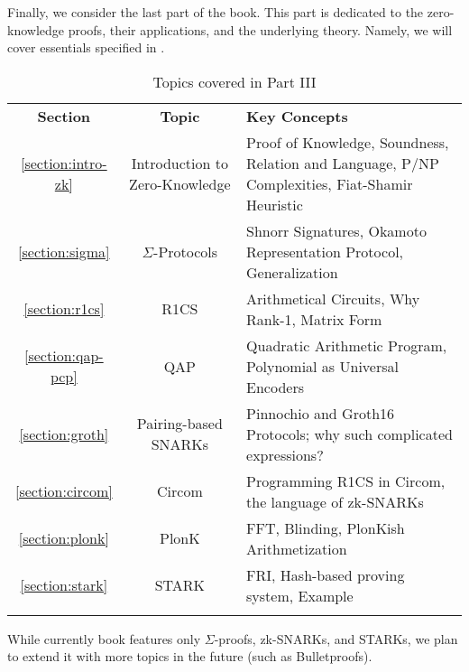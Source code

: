 \documentclass[../../lecture-notes-148x210.tex]{subfiles}
\begin{document}
Finally, we consider the last part of the book. This part is dedicated to the
zero-knowledge proofs, their applications, and the underlying theory. Namely, we
will cover essentials specified in .

\begin{table}[H]
    \centering
    \begin{tabularx}{\textwidth}{ccX}
        \Xhline{3\arrayrulewidth}
        \rowcolor{purple!30}\textbf{Section} & \textbf{Topic} & \textbf{Key Concepts} \\
        \Xhline{3\arrayrulewidth}
        \rowcolor{purple!10}\ref{section:intro-zk} & Introduction to Zero-Knowledge & Proof of Knowledge, 
        Soundness, Relation and Language, P/NP Complexities, Fiat-Shamir Heuristic  \\
        \hdashline
        \rowcolor{purple!20}\ref{section:sigma} & $\Sigma$-Protocols &
        Shnorr Signatures, Okamoto Representation Protocol, Generalization \\
        \hdashline
        \rowcolor{purple!10}\ref{section:r1cs} & R1CS & Arithmetical Circuits, Why Rank-1, Matrix Form \\
        \hdashline
        \rowcolor{purple!20}\ref{section:qap-pcp} & QAP & Quadratic Arithmetic Program, Polynomial as Universal Encoders \\
        \hdashline
        \rowcolor{purple!10}\ref{section:groth} & Pairing-based SNARKs & Pinnochio and Groth16 Protocols; why such complicated expressions? \\
        \hdashline
        \rowcolor{purple!20}\ref{section:circom} & Circom & Programming R1CS in Circom, the language of zk-SNARKs \\
        \hdashline
        \rowcolor{purple!10}\ref{section:plonk} & PlonK & FFT, Blinding, PlonKish Arithmetization \\
        \hdashline
        \rowcolor{purple!20}\ref{section:stark} & STARK & FRI, Hash-based proving system, Example \\
        \Xhline{3\arrayrulewidth}
    \end{tabularx}
    \caption{Topics covered in Part III}
    \label{tab:essentialls-3}
\end{table}

While currently book features only $\Sigma$-proofs, zk-SNARKs, and STARKs, we
plan to extend it with more topics in the future (such as Bulletproofs). 
\end{document}
